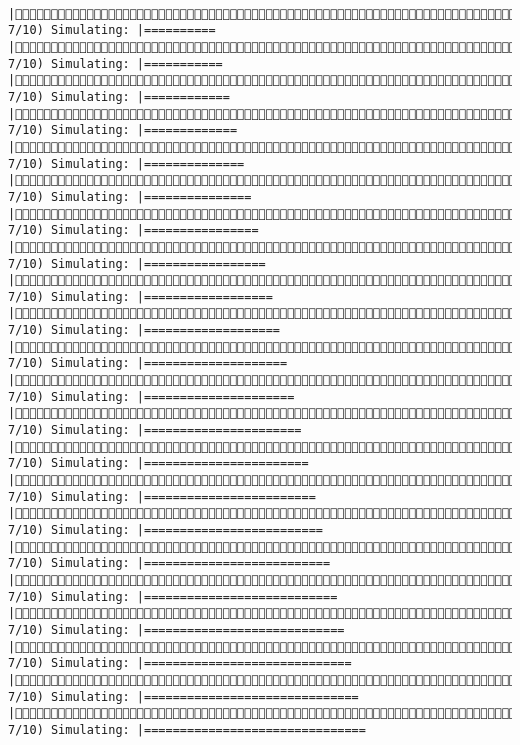 \documentclass[]{article}
\begin{document}
\begin{verbatim}
             |( 7/10) Simulating: |==========                                           |( 7/10) Simulating: |===========                                          |( 7/10) Simulating: |============                                         |( 7/10) Simulating: |=============                                        |( 7/10) Simulating: |==============                                       |( 7/10) Simulating: |===============                                      |( 7/10) Simulating: |================                                     |( 7/10) Simulating: |=================                                    |( 7/10) Simulating: |==================                                   |( 7/10) Simulating: |===================                                  |( 7/10) Simulating: |====================                                 |( 7/10) Simulating: |=====================                                |( 7/10) Simulating: |======================                               |( 7/10) Simulating: |=======================                              |( 7/10) Simulating: |========================                             |( 7/10) Simulating: |=========================                            |( 7/10) Simulating: |==========================                           |( 7/10) Simulating: |===========================                          |( 7/10) Simulating: |============================                         |( 7/10) Simulating: |=============================                        |( 7/10) Simulating: |==============================                       |( 7/10) Simulating: |===============================                      
\end{verbatim}
\end{document}
